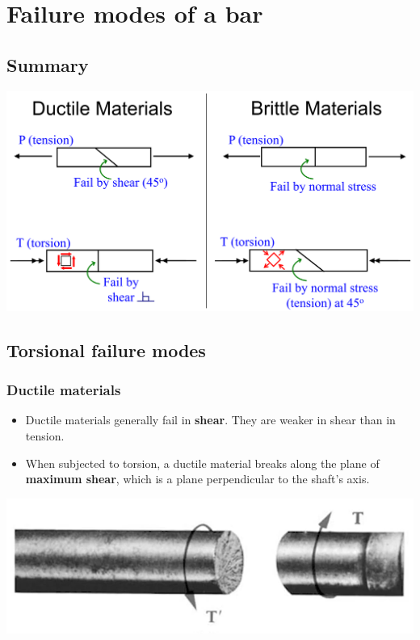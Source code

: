 \documentclass[11pt]{article}
\begin{document}
\section{Failure modes of a bar}
\label{sec:org810eff3}

\subsection{Summary}
\label{sec:org324bebc}
\begin{center}
\includegraphics[width=.9\linewidth]{./images/failure-modes-summary.png}
\end{center}

\newpage
\subsection{Torsional failure modes}
\label{sec:orgfd26a80}

\subsubsection{Ductile materials}
\label{sec:org2f9e25f}
\begin{itemize}
\item Ductile materials generally fail in \textbf{shear}. They are weaker in shear than in tension.
\item When subjected to torsion, a ductile material breaks along the plane of \textbf{maximum shear}, which is a plane perpendicular to the shaft's axis.
\end{itemize}

\begin{center}
\includegraphics[width=.9\linewidth]{./images/ductile-material-torsional-failure.png}
\end{center}
\end{document}
